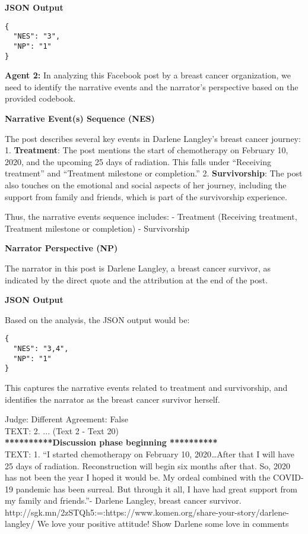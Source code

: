 \textbf{JSON Output}

\begin{verbatim}
{
  "NES": "3",
  "NP": "1"
}
\end{verbatim}

\textbf{Agent 2:} In analyzing this Facebook post by a breast cancer
organization, we need to identify the narrative events and the
narrator's perspective based on the provided codebook.

\textbf{Narrative Event(s) Sequence
(NES)}

The post describes several key events in Darlene Langley's breast cancer
journey: 1. \textbf{Treatment}: The post mentions the start of
chemotherapy on February 10, 2020, and the upcoming 25 days of
radiation. This falls under ``Receiving treatment'' and ``Treatment
milestone or completion.'' 2. \textbf{Survivorship}: The post also
touches on the emotional and social aspects of her journey, including
the support from family and friends, which is part of the survivorship
experience.

Thus, the narrative events sequence includes: - Treatment (Receiving
treatment, Treatment milestone or completion) - Survivorship

\textbf{Narrator Perspective (NP)}

The narrator in this post is Darlene Langley, a breast cancer survivor,
as indicated by the direct quote and the attribution at the end of the
post.

\textbf{JSON Output}

Based on the analysis, the JSON output would be:

\begin{verbatim}
{
  "NES": "3,4",
  "NP": "1"
}
\end{verbatim}

This captures the narrative events related to treatment and
survivorship, and identifies the narrator as the breast cancer survivor
herself.

Judge: Different Agreement: False\\

TEXT: 2. ... (Text 2 - Text 20)\\

\textbf{**********Discussion phase beginning **********}\\

TEXT: 1. ``I started chemotherapy on February 10, 2020\ldots After that
I will have 25 days of radiation. Reconstruction will begin six months
after that. So, 2020 has not been the year I hoped it would be. My
ordeal combined with the COVID-19 pandemic has been surreal. But through
it all, I have had great support from my family and friends.''- Darlene
Langley, breast cancer survivor.
http://sgk.mn/2zSTQh5:=:https://www.komen.org/share-your-story/darlene-langley/ We love your positive attitude! Show Darlene some love in comments\\

